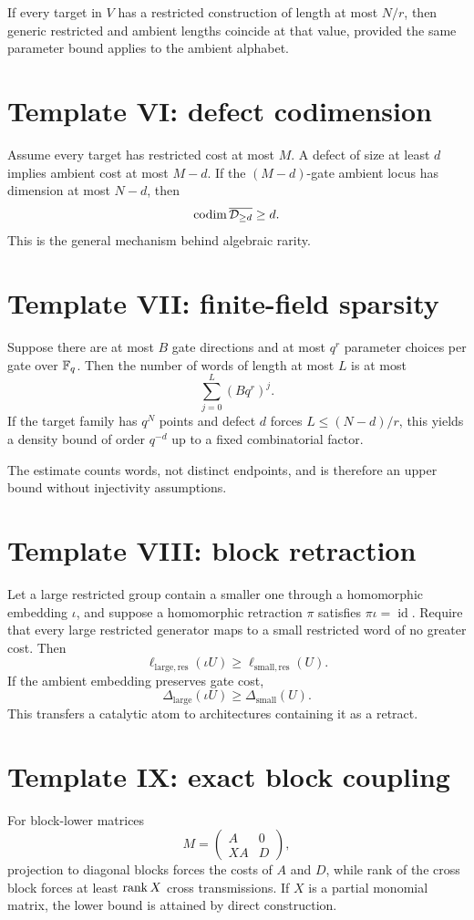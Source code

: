 If every target in $V$ has a restricted construction of length at most $N/r$, then generic restricted and ambient lengths coincide at that value, provided the same parameter bound applies to the ambient alphabet.

\section{Template VI: defect codimension}
Assume every target has restricted cost at most $M$.  A defect of size at least $d$ implies ambient cost at most $M-d$.  If the $(M-d)$-gate ambient locus has dimension at most $N-d$, then
\[
\operatorname{codim}\overline{\mathcal D_{\ge d}}\ge d.
\]
This is the general mechanism behind algebraic rarity.

\section{Template VII: finite-field sparsity}
Suppose there are at most $B$ gate directions and at most $q^r$ parameter choices per gate over $\mathbb F_q$.  Then the number of words of length at most $L$ is at most
\[
\sum_{j=0}^L(Bq^r)^j.
\]
If the target family has $q^N$ points and defect $d$ forces $L\le (N-d)/r$, this yields a density bound of order $q^{-d}$ up to a fixed combinatorial factor.

The estimate counts words, not distinct endpoints, and is therefore an upper bound without injectivity assumptions.

\section{Template VIII: block retraction}
Let a large restricted group contain a smaller one through a homomorphic embedding $\iota$, and suppose a homomorphic retraction $\pi$ satisfies $\pi\iota=\operatorname{id}$.  Require that every large restricted generator maps to a small restricted word of no greater cost.  Then
\[
\ell_{\mathrm{large,res}}(\iota U)
\ge
\ell_{\mathrm{small,res}}(U).
\]
If the ambient embedding preserves gate cost,
\[
\Delta_{\mathrm{large}}(\iota U)
\ge
\Delta_{\mathrm{small}}(U).
\]
This transfers a catalytic atom to architectures containing it as a retract.

\section{Template IX: exact block coupling}
For block-lower matrices
\[
M=
\begin{pmatrix}
A&0\\
XA&D
\end{pmatrix},
\]
projection to diagonal blocks forces the costs of $A$ and $D$, while rank of the cross block forces at least $\operatorname{rank} X$ cross transmissions.  If $X$ is a partial monomial matrix, the lower bound is attained by direct construction.

